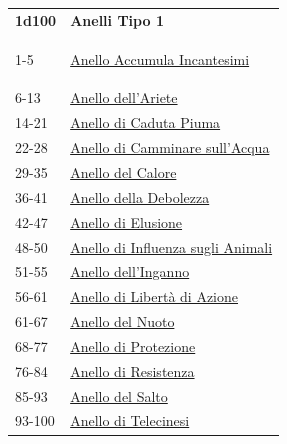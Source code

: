 \begin{multicols}{2}
{{\small\begin{tabular}{ll}
\textbf{1d100} & \textbf{Anelli Tipo 1}\\\hypertarget{Anello Tipo 1}{}
1-5 & \hyperlink{AnelloAccumulaIncantesimi}{Anello Accumula Incantesimi}\\
6-13& \hyperlink{Anellodell'Ariete}{Anello dell'Ariete}\\
14-21 & \hyperlink{AnellodiCadutaPiuma}{Anello di Caduta Piuma}\\
22-28 & \hyperlink{AnellodiCamminaresull'Acqua}{Anello di Camminare sull'Acqua}\\
29-35 & \hyperlink{AnellodelCalore}{Anello del Calore}\\
36-41 & \hyperlink{AnellodellaDebolezza}{Anello della Debolezza}\\
42-47 & \hyperlink{AnellodiElusione}{Anello di Elusione}\\
48-50 & \hyperlink{AnellodiInfluenzasugliAnimali}{Anello di Influenza sugli Animali}\\
51-55 & \hyperlink{Anellodell'Inganno}{Anello dell'Inganno}\\
56-61 & \hyperlink{AnellodiLibertàdiAzione}{Anello di Libertà di Azione}\\
61-67 & \hyperlink{AnellodelNuoto}{Anello del Nuoto}\\
68-77 & \hyperlink{AnellodiProtezione}{Anello di Protezione}\\
76-84 & \hyperlink{AnellodiResistenza}{Anello di Resistenza}\\
85-93 & \hyperlink{AnellodelSalto}{Anello del Salto}\\
93-100 & \hyperlink{AnellodiTelecinesi}{Anello di Telecinesi}
\end{tabular}}

\medskip

}
\end{multicols}
